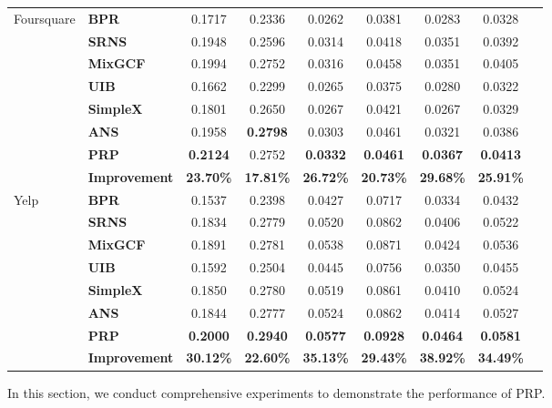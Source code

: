 \begin{table}[t]
\begin{center}
\begin{tabular}{@{}llccccccc@{}}
 \midrule

 \multirow{8}{*}{Foursquare} 
   & \textbf{BPR} & 0.1717 & 0.2336 & 0.0262 & 0.0381 & 0.0283 &  0.0328 \\
  & \textbf{SRNS} & 0.1948 & 0.2596 & 0.0314 & 0.0418 & 0.0351 & 0.0392\\
 & \textbf{MixGCF} & 0.1994 & 0.2752 & 0.0316 & 0.0458 & 0.0351 & 0.0405  \\
 & \textbf{UIB} & 0.1662 & 0.2299 & 0.0265 & 0.0375 & 0.0280 & 0.0322 \\ 
& \textbf{SimpleX} & 0.1801 & 0.2650 & 0.0267 & 0.0421 & 0.0267 & 0.0329  \\ 
& \textbf{ANS} & 0.1958 & \textbf{0.2798} & 0.0303 & 0.0461 & 0.0321 & 0.0386  \\ 
& \textbf{PRP} & \textbf{0.2124} & 0.2752 & \textbf{0.0332} & \textbf{0.0461} & \textbf{0.0367} & \textbf{0.0413} \\ 
\cmidrule{2-8}
& \textbf{Improvement} & \textbf{23.70\%}& \textbf{17.81\%} & \textbf{26.72\%} & \textbf{20.73\%} & \textbf{29.68\%}& \textbf{25.91\%} \\ 
 
 \midrule
 
\multirow{8}{*}{Yelp} 
   & \textbf{BPR} & 0.1537 & 0.2398 & 0.0427 & 0.0717 & 0.0334 &  0.0432 \\
  & \textbf{SRNS} & 0.1834 & 0.2779 & 0.0520 & 0.0862 & 0.0406 & 0.0522 \\
 & \textbf{MixGCF} & 0.1891 & 0.2781 & 0.0538 & 0.0871 & 0.0424 & 0.0536  \\
 & \textbf{UIB} & 0.1592 & 0.2504 & 0.0445 & 0.0756 & 0.0350  & 0.0455 \\ 
& \textbf{SimpleX} & 0.1850 & 0.2780 & 0.0519 & 0.0861 & 0.0410 & 0.0524  \\ 
& \textbf{ANS} & 0.1844 & 0.2777 & 0.0524 & 0.0862 & 0.0414 & 0.0527  \\ 
& \textbf{PRP} & \textbf{0.2000} & \textbf{0.2940} & \textbf{0.0577} & \textbf{0.0928} & \textbf{0.0464} & \textbf{0.0581} \\ 
\cmidrule{2-8}
& \textbf{Improvement} & \textbf{30.12\%}& \textbf{22.60\%} & \textbf{35.13\%} & \textbf{29.43\%} & \textbf{38.92\%}& \textbf{34.49\%} \\ 

 \bottomrule
 \end{tabular}
  \end{center}
\end{table}
In this section, we conduct comprehensive experiments to demonstrate the performance of PRP.
